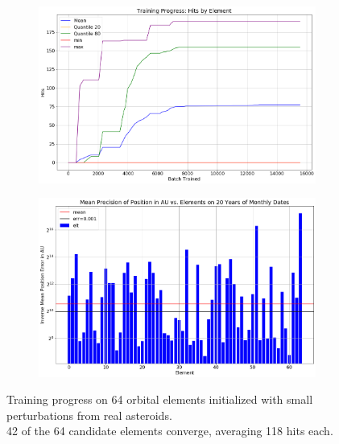 \begin{figure}[h]
\begin{subfigure}[t]{\subfigwidth\textwidth}
\end{subfigure}
\hfill
\begin{subfigure}[t]{\subfigwidth\textwidth}
\centering
\includegraphics[width=\linewidth]{../figs/search_known/perturbed_small/learning_curve_hits.png}
\end{subfigure}
\medskip
\begin{subfigure}[t]{\textwidth}
\includegraphics[width=1.0\textwidth]{../figs/search_known/perturbed_small/near_ast_dist.png}
\end{subfigure}
\caption{Training progress on 64 orbital elements initialized with small perturbations from real asteroids.\\
42 of the 64 candidate elements converge, averaging 118 hits each.}
\label{fig:TrainingPerturbedSmall}
\end{figure}
\clearpage

